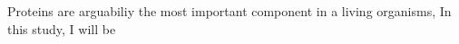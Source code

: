 Proteins are arguabiliy the most important component in a living organisms,  In this study, I will be 